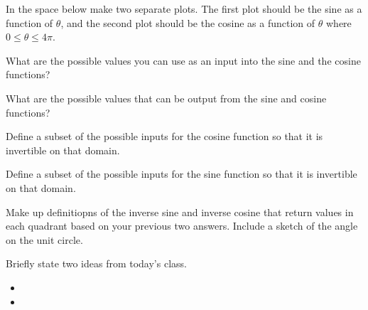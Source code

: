 \begin{problem}
  \clearpage

\item In the space below make two separate plots. The first plot
  should be the sine as a function of $\theta$, and the second plot
  should be the cosine as a function of $\theta$ where
  $0\leq\theta\leq 4\pi$.  


  \vfill

\item What are the possible values you can use as an input into the
  sine and the cosine functions?  
  \vspace{3em}

\item What are the possible values that can be output from the sine
  and cosine functions?
  \vspace{3em}

  \clearpage

\item Define a subset of the possible inputs for the cosine function
  so that it is invertible on that domain.

  \vfill

\item Define a subset of the possible inputs for the sine function
  so that it is invertible on that domain.

  \vfill

\item Make up definitiopns of the inverse sine and inverse cosine that
  return values in each quadrant based on your previous two
  answers. Include a sketch of the angle on the unit circle.

  \vfill

\end{problem}

\postClass

\begin{problem}
\item Briefly state two ideas from today's class.
  \begin{itemize}
  \item 
  \item 
  \end{itemize}
\item 
  \begin{subproblem}
    \item
  \end{subproblem}
\end{problem}


